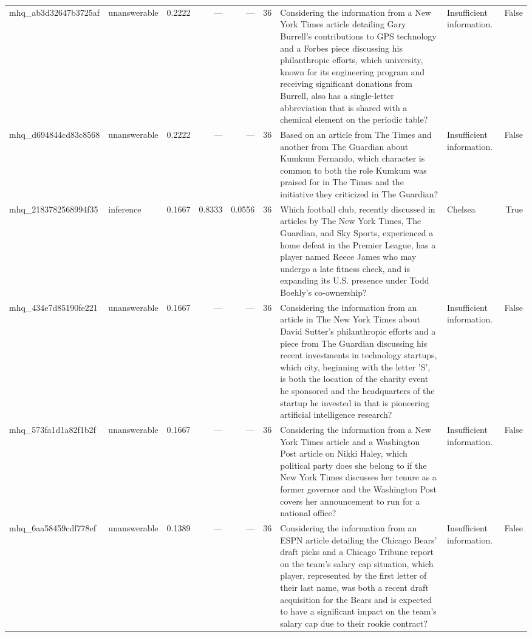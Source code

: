 \begin{tabular}{llrrrrllr}
mhq_ab3d32647b3725af & unanswerable & 0.2222 & — & — & 36 & Considering the information from a New York Times article detailing Gary Burrell's contributions to GPS technology and a Forbes piece discussing his philanthropic efforts, which university, known for its engineering program and receiving significant donations from Burrell, also has a single-letter abbreviation that is shared with a chemical element on the periodic table? & Insufficient information. & False \\
mhq_d694844cd83c8568 & unanswerable & 0.2222 & — & — & 36 & Based on an article from The Times and another from The Guardian about Kumkum Fernando, which character is common to both the role Kumkum was praised for in The Times and the initiative they criticized in The Guardian? & Insufficient information. & False \\
mhq_2183782568994f35 & inference & 0.1667 & 0.8333 & 0.0556 & 36 & Which football club, recently discussed in articles by The New York Times, The Guardian, and Sky Sports, experienced a home defeat in the Premier League, has a player named Reece James who may undergo a late fitness check, and is expanding its U.S. presence under Todd Boehly's co-ownership? & Chelsea & True \\
mhq_434e7d85190fe221 & unanswerable & 0.1667 & — & — & 36 & Considering the information from an article in The New York Times about David Sutter's philanthropic efforts and a piece from The Guardian discussing his recent investments in technology startups, which city, beginning with the letter 'S', is both the location of the charity event he sponsored and the headquarters of the startup he invested in that is pioneering artificial intelligence research? & Insufficient information. & False \\
mhq_573fa1d1a82f1b2f & unanswerable & 0.1667 & — & — & 36 & Considering the information from a New York Times article and a Washington Post article on Nikki Haley, which political party does she belong to if the New York Times discusses her tenure as a former governor and the Washington Post covers her announcement to run for a national office? & Insufficient information. & False \\
mhq_6aa58459cdf778ef & unanswerable & 0.1389 & — & — & 36 & Considering the information from an ESPN article detailing the Chicago Bears' draft picks and a Chicago Tribune report on the team's salary cap situation, which player, represented by the first letter of their last name, was both a recent draft acquisition for the Bears and is expected to have a significant impact on the team's salary cap due to their rookie contract? & Insufficient information. & False \\

\end{tabular}

